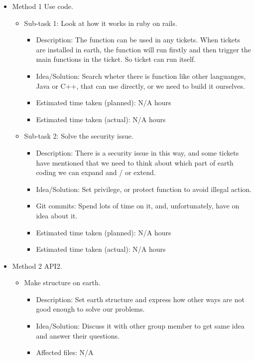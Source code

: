 \documentclass{article}
\begin{document}
\begin{itemize}
	\item Method 1 Use code.
	     \begin{itemize}
	        \item Sub-task 1: Look at how it works in ruby on rails.
	           \begin{itemize}
					\item Description: The function can be used in any tickets. When tickets are installed in earth, the function will run firstly and then trigger the main functions in the ticket. So ticket can run itself.
					\item Idea/Solution: Search wheter there is function like other languanges, Java or C++, that can use directly, or we need to build it ourselves. 
					\item Estimated time taken (planned): N/A hours
					\item Estimated time taken (actual): N/A hours
				\end{itemize}
			\item Sub-task 2: Solve the security issue.
			   \begin{itemize}
					\item Description: There is a security issue in this way, and some tickets have mentioned that we need to think about which part of earth coding we can expand and / or extend. 
					\item Idea/Solution: Set privilege, or protect function to avoid illegal action.
					\item Git commits: Spend lots of time on it, and, unfortunately, have on idea about it.
					\item Estimated time taken (planned): N/A hours
					\item Estimated time taken (actual): N/A hours
				\end{itemize}
	     \end{itemize}
	\item Method 2 API2.
	     \begin{itemize}
	         \item Make structure on earth.
	            \begin{itemize}
	              \item Description: Set earth structure and express how other ways are not good enough to solve our problems. 
					\item Idea/Solution: Discuss it with other group member to get same idea and answer their questions.
					\item Affected files: N/A

\end{itemize}
\end{itemize}
\end{itemize}
\end{document}
